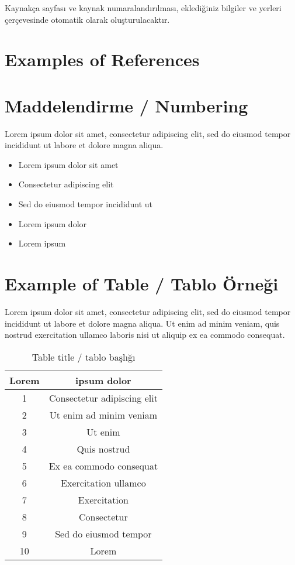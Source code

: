 Kaynakça sayfası ve kaynak numaralandırılması, eklediğiniz bilgiler ve yerleri çerçevesinde otomatik olarak oluşturulacaktır.


\section{Examples of References}



\section{Maddelendirme / Numbering}
Lorem ipsum dolor sit amet, consectetur adipiscing elit, sed do eiusmod tempor incididunt ut labore et dolore magna aliqua. 
\begin{itemize}
\item Lorem ipsum dolor sit amet
\item Consectetur adipiscing elit
\item Sed do eiusmod tempor incididunt ut
\item Lorem ipsum dolor
\item Lorem ipsum 
\end{itemize}

\section{Example of Table / Tablo Örneği}
Lorem ipsum dolor sit amet, consectetur adipiscing elit, sed do eiusmod tempor incididunt ut labore et dolore magna aliqua. Ut enim ad minim veniam, quis nostrud exercitation ullamco laboris nisi ut aliquip ex ea commodo consequat.

\begin{table}[!ht]
\caption{Table title / tablo başlığı}
\centering
\begin{tabular}{|c|c|}
\hline
\textbf{Lorem} & \textbf{ipsum dolor}      \\ \hline
1                  & Consectetur adipiscing elit \\ \hline
2                  & Ut enim ad minim veniam               \\ \hline
3                  & Ut enim             \\ \hline
4                  & Quis nostrud            \\ \hline
5                  & Ex ea commodo consequat          \\ \hline
6                  & Exercitation ullamco             \\ \hline
7                  & Exercitation              \\ \hline
8                  & Consectetur                \\ \hline
9                  & Sed do eiusmod tempor  \\ \hline
10                 & Lorem                \\ \hline
\end{tabular}
\end{table}

